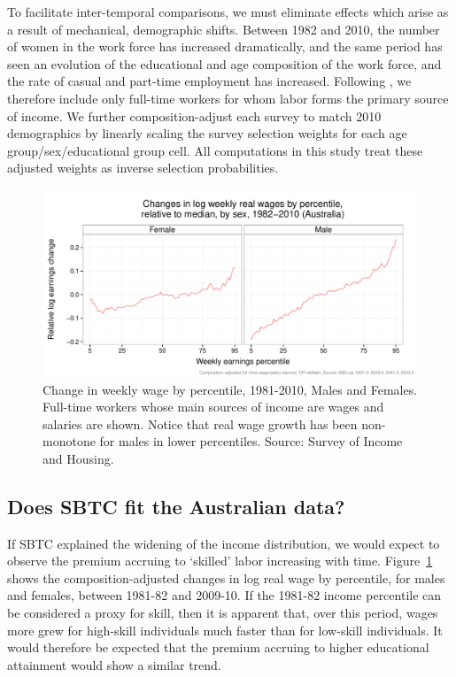 To facilitate inter-temporal comparisons, we must eliminate effects which arise as a result of mechanical, demographic shifts. Between 1982 and 2010, the number of women in the work force has increased dramatically, and the same period has seen an evolution of the educational and age composition of the work force, and the rate of casual and part-time employment has increased. Following \citet{Acemoglu2011}, we therefore include only full-time workers for whom labor forms the primary source of income. We further composition-adjust each survey to match 2010 demographics by linearly scaling the survey selection weights for each age group/sex/educational group cell. All computations in this study treat these adjusted weights as inverse selection probabilities.

\begin{figure}
  \centering
  \includegraphics[width=\textwidth]{../figure/quantile_mf.pdf}
  \caption{Change in weekly wage by percentile, 1981-2010, Males and Females. Full-time workers whose main sources of income are wages and salaries are shown. Notice that real wage growth has been non-monotone for males in lower percentiles. Source: Survey of Income and Housing.}
  \label{fig:banana}
\end{figure}

\subsection{Does SBTC fit the Australian data?}

If SBTC explained the widening of the income distribution, we would expect to observe the premium accruing to `skilled' labor increasing with time. Figure~\ref{fig:banana} shows the composition-adjusted changes in log real wage by percentile, for males and females, between 1981-82 and 2009-10. If the 1981-82 income percentile can be considered a proxy for skill, then it is apparent that, over this period, wages more grew for high-skill individuals much faster than for low-skill individuals. It would therefore be expected that the premium accruing to higher educational attainment would show a similar trend.

